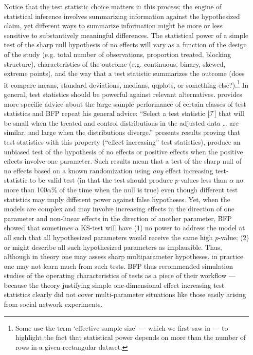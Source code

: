 Notice that the test statistic choice matters in this process: the engine of
statistical inference involves summarizing information against the
hypothesized claim, yet different ways to summarize information might be more
or less sensitive to substantively meaningful differences. The statistical
power of a simple test of the sharp null hypothesis of no effects will vary as
a function of the design of the study (e.g. total number of observations, proportion treated, blocking structure), characteristics of the outcome (e.g. continuous, binary, skewed, extreme
points), and the way that a test statistic summarizes the outcome (does
it compare means, standard deviations, medians, qqplots, or something else?).\footnote{Some
  use the term `effective sample size' --- which we first saw in
  \citet{kish65} ---
  to highlight the fact that statistical power depends on more than the number
  of rows in a given rectangular dataset. } In general,
test statistics should be powerful against relevant alternatives. \citet[\S 2.4.4]{rosenbaum:2002} provides more specific
advice about the large sample performance of certain classes of test statistics
and BFP repeat his general advice: ``Select a test statistic [$\mathcal{T}$] that will be
small when the treated and control distributions in the adjusted data \ldots
are similar, and large when the distributions diverge.'' \citet[Proposition 4
and 5, \S 2.9]{rosenbaum:2002} presents results proving that test statistics
with this property (``effect increasing'' test statistics), produce an
unbiased test of the hypothesis of no effects or positive effects when the
positive effects involve one parameter. Such results mean that a test of
the sharp null of no effects
based on a known randomization using \emph{any} effect increasing
test-statistic to be valid test (in that the test should produce $p$-values
less than $\alpha$ no more than 100$\alpha \%$ of the time when the null is true) even though different
test statistics may imply different power against false hypotheses.  Yet, when the models are complex and
may involve increasing effects in the direction of one parameter and
non-linear effects in the direction of another parameter, BFP showed that
sometimes a KS-test will have (1) no power to address the model at all such
that all hypothesized parameters would receive the same high $p$-value; (2) or might describe all such hypothesized parameters as
implausible. Thus,
although in theory one may assess sharp multiparameter hypotheses,
 in practice one may not learn much from such tests. BFP thus recommended simulation studies of the operating
characteristics of tests as a piece of their workflow --- because  the theory
justifying simple one-dimensional effect increasing test statistics clearly
did not cover multi-parameter situations like those easily arising from social
network experiments.

